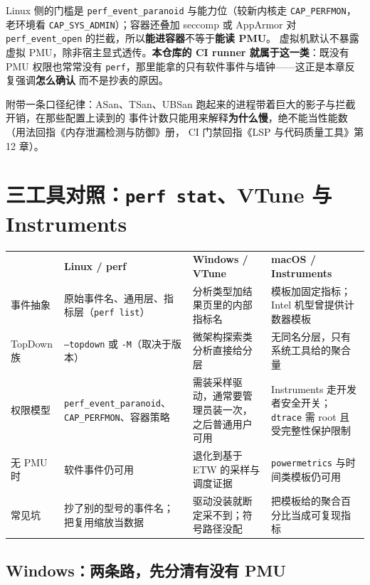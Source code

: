 \documentclass[12pt,a4paper,fontset=fandol]{ctexbook}
\newcommand{\Tp}[1]{\texttt{#1}}
\newcommand{\Bk}{\discretionary{}{}{}}
\begin{document}
Linux 侧的门槛是 \Tp{perf\_event{\Bk}\_paranoid} 与能力位（较新内核走 \Tp{CAP{\Bk}\_PERFMON}，
老环境看 \Tp{CAP{\Bk}\_SYS{\Bk}\_ADMIN}）；容器还叠加 seccomp 或 AppArmor 对
\Tp{perf\_event{\Bk}\_open} 的拦截，所以\textbf{能进容器}不等于\textbf{能读 PMU}。
虚拟机默认不暴露虚拟 PMU，除非宿主显式透传。\textbf{本仓库的 CI runner 就属于这一类}：既没有
PMU 权限也常常没有 \Tp{perf}，那里能拿的只有软件事件与墙钟——这正是本章反复强调\textbf{怎么确认}
而不是抄表的原因。

附带一条口径纪律：ASan、TSan、UBSan 跑起来的进程带着巨大的影子与拦截开销，在那些配置上读到的
事件计数只能用来解释\textbf{为什么慢}，绝不能当性能数（用法回指《内存泄漏检测与防御》册，
CI 门禁回指《LSP 与代码质量工具》第 12 章）。

\section{三工具对照：\Tp{perf stat}、VTune 与 Instruments}
\label{sec:pm05-tools}

\begin{compare}[title={事件计数在三个平台上的抽象与门槛}]
\begin{tabular}{>{\raggedright\arraybackslash}p{} >{\raggedright\arraybackslash}p{} >{\raggedright\arraybackslash}p{} >{\raggedright\arraybackslash}p{}}
 & \textbf{Linux / perf} & \textbf{Windows / VTune} & \textbf{macOS / Instruments} \\
事件抽象 & 原始事件名、通用层、指标层（\Tp{perf list}） &
  分析类型加结果页里的内部指标名 & 模板加固定指标；Intel 机型曾提供计数器模板 \\
TopDown 族 & \Tp{--topdown} 或 \Tp{-M}（取决于版本） &
  微架构探索类分析直接给分层 & 无同名分层，只有系统工具给的聚合量 \\
权限模型 & \Tp{perf\_event{\Bk}\_paranoid}、\Tp{CAP{\Bk}\_PERFMON}、容器策略 &
  需装采样驱动，通常要管理员装一次，之后普通用户可用 &
  Instruments 走开发者安全开关；\Tp{dtrace} 需 root 且受完整性保护限制 \\
无 PMU 时 & 软件事件仍可用 & 退化到基于 ETW 的采样与调度证据 &
  \Tp{powermetrics} 与时间类模板仍可用 \\
常见坑 & 抄了别的型号的事件名；把复用缩放当数据 &
  驱动没装就断定采不到；符号路径没配 & 把模板给的聚合百分比当成可复现指标 \\
\end{tabular}
\end{compare}

\subsection*{Windows：两条路，先分清有没有 PMU}
\end{document}
